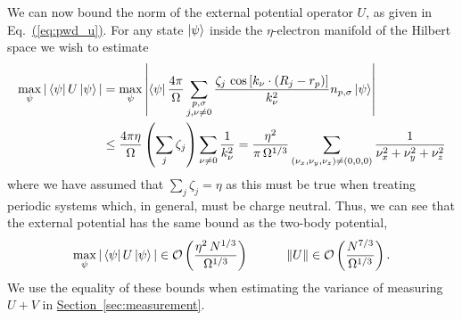 \documentclass[superscriptaddress,aps,pra,nofootinbib,notitlepage,10pt,longbibliography]{revtex4-1}
\newcommand{\eq}[1]{Eq.~\hyperref[eq:#1]{(\ref*{eq:#1})}}
\renewcommand{\sec}[1]{\hyperref[sec:#1]{Section~\ref*{sec:#1}}}
\def\bra#1{\mathinner{\langle{#1}|}}
\def\ket#1{\mathinner{|{#1}\rangle}}
\begin{document}
We can now bound the norm of the external potential operator $U$, as given in \eq{pwd_u}. For any state $\ket{\psi}$ inside the $\eta$-electron manifold of the Hilbert space we wish to estimate
\begin{align}
\max_{\psi} | \bra{\psi} U\ket{\psi}| & = \max_\psi \left | \bra{\psi} \frac{4 \pi}{\Omega} \sum_{\substack{p,\sigma \\ j, \nu\neq 0}} \frac{\zeta_j \, \cos\left[ k_{\nu} \cdot \left(R_j - r_{p}\right)\right] }{k_\nu^2} n_{p, \sigma} \ket{\psi} \right| \\
%
& \le \frac{4\pi \eta}{\Omega} \left(\sum_j \zeta_j\right) \sum_{\nu \neq 0} \frac{1}{k_\nu^2} = \frac{\eta^2}{\pi \, \Omega^{1/3}} \sum_{(\nu_x, \nu_y, \nu_z) \neq (0,0,0)} \frac{1}{\nu_x^2 + \nu_y^2 + \nu_z^2}\nonumber
\end{align}
where we have assumed that $\sum_j \zeta_j = \eta$ as this must be true when treating periodic systems which, in general, must be charge neutral. Thus, we can see that the external potential has the same bound as the two-body potential,
\begin{equation}
\label{eq:u_bound}
\max_{\psi} | \bra{\psi} U\ket{\psi}| \in {\cal O}\left(\frac{\eta^2 \, N^{1/3}}{\Omega^{1/3}}\right)
%
\quad \quad \quad \left\| U \right\| \in {\cal O}\left(\frac{N^{7/3}}{\Omega^{1/3}}\right).
\end{equation}
We use the equality of these bounds when estimating the variance of measuring $U + V$ in \sec{measurement}.
\end{document}
